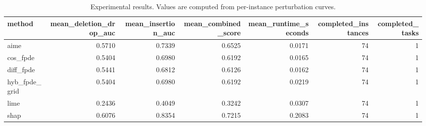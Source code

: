 \begin{table}[t]
\caption{Experimental results. Values are computed from per-instance perturbation curves.}
\label{tab:main_results_computed}
\centering
\begin{tabular}{lrrrrrr}
\toprule
method & mean\_deletion\_drop\_auc & mean\_insertion\_auc & mean\_combined\_score & mean\_runtime\_seconds & completed\_instances & completed\_tasks \\
\midrule
aime & 0.5710 & 0.7339 & 0.6525 & 0.0171 & 74 & 1 \\
cos\_fpde & 0.5404 & 0.6980 & 0.6192 & 0.0165 & 74 & 1 \\
diff\_fpde & 0.5441 & 0.6812 & 0.6126 & 0.0162 & 74 & 1 \\
hyb\_fpde\_grid & 0.5404 & 0.6980 & 0.6192 & 0.0219 & 74 & 1 \\
lime & 0.2436 & 0.4049 & 0.3242 & 0.0307 & 74 & 1 \\
shap & 0.6076 & 0.8354 & 0.7215 & 0.2083 & 74 & 1 \\
\bottomrule
\end{tabular}

\end{table}
